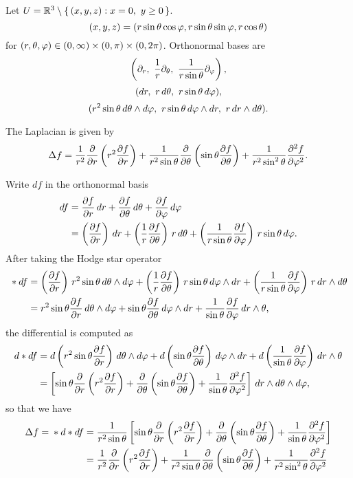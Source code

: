 \documentclass{../note}
\begin{document}
\begin{prb}
Let $U=\R^3\setminus\{\,(x,y,z):x=0,\ y\ge0\,\}$.
\[(x,y,z)=(r\sin\theta\cos\varphi,r\sin\theta\sin\varphi,r\cos\theta)\]
for $(r,\theta,\varphi)\in(0,\infty)\times(0,\pi)\times(0,2\pi)$.
Orthonormal bases are
\[\left(\pd_r,\ \frac1r\pd_\theta,\ \frac1{r\sin\theta}\pd_\f\right),\]
\[(dr,\ r\,d\theta,\ r\sin\theta\,d\varphi),\]
\[(r^2\sin\theta\,d\theta\wedge d\f,\ r\sin\theta\,d\f\wedge dr,\ r\,dr\wedge d\theta).\]
\begin{parts}
\item
\item The Laplacian is given by
\[\Delta f=\frac1{r^2}\pd{r}\left(r^2\pd{f}{r}\right)+\frac1{r^2\sin\theta}\pd{\theta}\left(\sin\theta\pd{f}{\theta}\right)+\frac1{r^2\sin^2\theta}\pd[2]{f}{\f}.\]
\end{parts}
\end{prb}
\begin{pf}
Write $df$ in the orthonormal basis
\begin{align*}
df&=\pd{f}{r}\,dr+\pd{f}{\theta}\,d\theta+\pd{f}{\f}\,d\f\\
&=\left(\pd{f}{r}\right)\,dr+\left(\frac1r\pd{f}{\theta}\right)\,r\,d\theta+\left(\frac1{r\sin\theta}\pd{f}{\f}\right)\,r\sin\theta\,d\f.
\end{align*}
After taking the Hodge star operator
\begin{align*}
{}*df&=\left(\pd{f}{r}\right)\,r^2\sin\theta\,d\theta\wedge d\f+\left(\frac1r\pd{f}{\theta}\right)\,r\sin\theta\,d\f\wedge dr+\left(\frac1{r\sin\theta}\pd{f}{\f}\right)\,r\,dr\wedge d\theta\\
&=r^2\sin\theta\pd{f}{r}\,d\theta\wedge d\f+\sin\theta\pd{f}{\theta}\,d\f\wedge dr+\frac1{\sin\theta}\pd{f}{\f}\,dr\wedge\theta,
\end{align*}
the differential is computed as
\begin{align*}
d*df&=d\left(r^2\sin\theta\pd{f}{r}\right)\,d\theta\wedge d\f+d\left(\sin\theta\pd{f}{\theta}\right)\,d\f\wedge dr+d\left(\frac1{\sin\theta}\pd{f}{\f}\right)\,dr\wedge\theta\\
&=\left[\sin\theta\pd{r}\left(r^2\pd{f}{r}\right)+\pd{\theta}\left(\sin\theta\pd{f}{\theta}\right)+\frac1{\sin\theta}\pd[2]{f}{\f}\right]\,dr\wedge d\theta\wedge d\f,
\end{align*}
so that we have
\begin{align*}
\Delta f={}*d*df&=\frac1{r^2\sin\theta}\left[\sin\theta\pd{r}\left(r^2\pd{f}{r}\right)+\pd{\theta}\left(\sin\theta\pd{f}{\theta}\right)+\frac1{\sin\theta}\pd[2]{f}{\f}\right]\\
&=\frac1{r^2}\pd{r}\left(r^2\pd{f}{r}\right)+\frac1{r^2\sin\theta}\pd{\theta}\left(\sin\theta\pd{f}{\theta}\right)+\frac1{r^2\sin^2\theta}\pd[2]{f}{\f}
\end{align*}

\end{pf}
\end{document}
